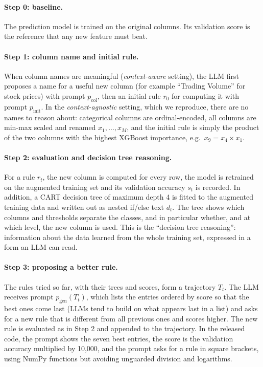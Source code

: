\documentclass[11pt]{article}
\begin{document}
\paragraph{Step 0: baseline.} The prediction model is trained on the original columns. Its
validation score is the reference that any new feature must beat.

\paragraph{Step 1: column name and initial rule.} When column names are meaningful
(\emph{context-aware} setting), the LLM first proposes a name for a useful new column (for example
``Trading Volume'' for stock prices) with prompt $p_{\text{col}}$, then an initial rule $r_0$ for
computing it with prompt $p_{\text{init}}$. In the \emph{context-agnostic} setting, which we
reproduce, there are no names to reason about: categorical columns are ordinal-encoded, all columns
are min-max scaled and renamed $x_1,\dots,x_M$, and the initial rule is simply the product of the two
columns with the highest XGBoost importance, e.g.\ $x_9=x_4\times x_1$.

\paragraph{Step 2: evaluation and decision tree reasoning.} For a rule $r_t$, the new column is
computed for every row, the model is retrained on the augmented training set and its validation
accuracy $s_t$ is recorded. In addition, a CART decision tree of maximum depth 4 is fitted to the
augmented training data and written out as nested if/else text $d_t$. The tree shows which columns
and thresholds separate the classes, and in particular whether, and at which level, the new column
is used. This is the ``decision tree reasoning'': information about the data learned from the whole
training set, expressed in a form an LLM can read.

\paragraph{Step 3: proposing a better rule.} The rules tried so far, with their trees and scores,
form a trajectory $T_t$. The LLM receives prompt $p_{\text{gen}}(T_t)$, which lists the entries
ordered by score so that the best ones come last (LLMs tend to build on what appears last in a list)
and asks for a new rule that is different from all previous ones and scores higher. The new rule is
evaluated as in Step 2 and appended to the trajectory. In the released code, the prompt shows the
seven best entries, the score is the validation accuracy multiplied by 10,000, and the prompt asks
for a rule in square brackets, using NumPy functions but avoiding unguarded division and logarithms.
\end{document}
